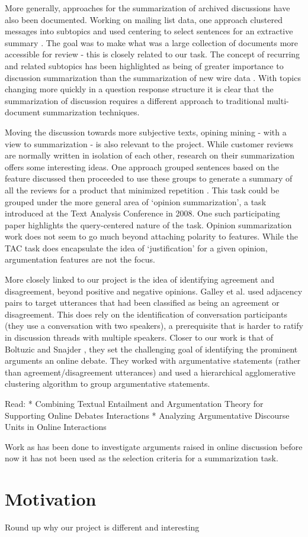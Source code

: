     More generally, approaches for the summarization of archived discussions have also been documented. Working on mailing list data, one approach clustered messages into subtopics and used centering to select sentences for an extractive summary \cite{newman2003summarizing}. The goal was to make what was a large collection of documents more accessible for review - this is closely related to our task. The concept of recurring and related subtopics has been highlighted as being of greater importance to discussion summarization than the summarization of new wire data \cite{zhou2006summarization}. With topics changing more quickly in a question response structure it is clear that the summarization of discussion requires a different approach to traditional multi-document summarization techniques.

    Moving the discussion towards more subjective texts, opining mining - with a view to summarization - is also relevant to the project. While customer reviews are normally written in isolation of each other, research on their summarization offers some interesting ideas. One approach grouped sentences based on the feature discussed then proceeded to use these groups to generate a summary of all the reviews for a product that minimized repetition \cite{hu2004mining}. This task could be grouped under the more general area of `opinion summarization', a task introduced at the Text Analysis Conference in 2008. One such participating paper \cite{lloret2009towards} highlights the query-centered nature of the task. Opinion summarization work does not seem to go much beyond attaching polarity to features. While the TAC task does encapsulate the idea of `justification' for a given opinion, argumentation features are not the focus.

    More closely linked to our project is the idea of identifying agreement and disagreement, beyond positive and negative opinions. Galley et al. \cite{galley2004identifying} used adjacency pairs to target utterances that had been classified as being an agreement or disagreement. This does rely on the identification of conversation participants (they use a conversation with two speakers), a prerequisite that is harder to ratify in discussion threads with multiple speakers. Closer to our work is that of Boltuzic and Snajder \cite{boltuzic2015identifying}, they set the challenging goal of identifying the prominent arguments an online debate. They worked with argumentative statements (rather than agreement/disagreement utterances) and used a hierarchical agglomerative clustering algorithm to group argumentative statements.

    Read:
    * Combining Textual Entailment and Argumentation Theory for Supporting Online Debates Interactions
    * Analyzing Argumentative Discourse Units in Online Interactions

    Work as has been done to investigate arguments raised in online discussion \cite{boltuzic2015identifying} before now it has not been used as the selection criteria for a summarization task.

  \section{Motivation}
    Round up why our project is different and interesting
